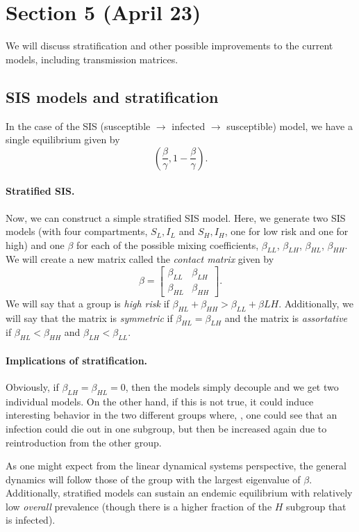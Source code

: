 \documentclass[12pt]{article}
\begin{document}
\section{Section 5 (April 23)}
We will discuss stratification and other possible improvements to the current models, including transmission matrices.

\subsection{SIS models and stratification}
In the case of the SIS (susceptible $\to$ infected $\to$ susceptible) model, we have a single equilibrium given by
\[
\left(\frac{\beta}{\gamma}, 1 - \frac{\beta}{\gamma}\right).
\]

\paragraph{Stratified SIS.} Now, we can construct a simple stratified SIS model. Here, we generate two SIS models (with four compartments, $S_L, I_L$ and $S_H, I_H$, one for low risk and one for high) and one $\beta$ for each of the possible mixing coefficients, $\beta_{LL}$, $\beta_{LH}$, $\beta_{HL}$, $\beta_{HH}$. We will create a new matrix called the \emph{contact matrix} given by
\[
\beta = \begin{bmatrix}
	\beta_{LL} & \beta_{LH}\\
	\beta_{HL} & \beta_{HH}
\end{bmatrix}.
\]
We will say that a group is \emph{high risk} if $\beta_{HL} + \beta_{HH} > \beta_{LL} + \beta{LH}$. Additionally, we will say that the matrix is \emph{symmetric} if $\beta_{HL} = \beta_{LH}$ and the matrix is \emph{assortative} if $\beta_{HL} < \beta_{HH}$ and $\beta_{LH} < \beta_{LL}$.

\paragraph{Implications of stratification.} Obviously, if $\beta_{LH} = \beta_{HL} = 0$, then the models simply decouple and we get two individual models. On the other hand, if this is not true, it could induce interesting behavior in the two different groups where, \eg, one could see that an infection could die out in one subgroup, but then be increased again due to reintroduction from the other group.

As one might expect from the linear dynamical systems perspective, the general dynamics will follow those of the group with the largest eigenvalue of $\beta$. Additionally, stratified models can sustain an endemic equilibrium with relatively low \emph{overall} prevalence (though there is a higher fraction of the $H$ subgroup that is infected).
\end{document}
